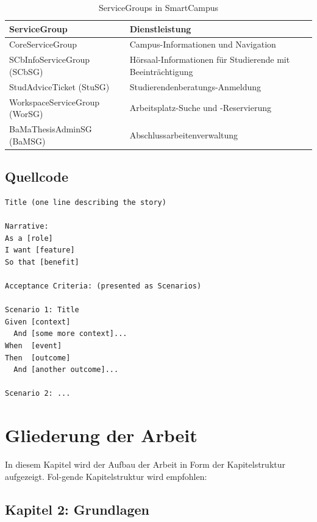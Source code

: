 \begin{table}
	\centering
	\begin{tabular}{ | l | p{7cm} | }
		\hline
		ServiceGroup & Dienstleistung \\
		\hline
		 CoreServiceGroup & Campus-Informationen und Navigation \\
	 	\hline
	 	SCbInfoServiceGroup (SCbSG) & Hörsaal-Informationen für Studierende mit Beeinträchtigung \\
	 	\hline
	 	 StudAdviceTicket (StuSG) & Studierendenberatungs-Anmeldung \\
	 	\hline
	 	WorkspaceServiceGroup (WorSG) & Arbeitsplatz-Suche und -Reservierung \\
	 	\hline
	 	BaMaThesisAdminSG (BaMSG) & Abschlussarbeitenverwaltung \\
	 	\hline
	\end{tabular}
	\caption{ServiceGroups in SmartCampus}
	\label{tab:smartcampus-servicegroups}
\end{table}

\subsection{Quellcode}
\vspace{0.5cm}
\begin{lstlisting}[caption = {Vorlage für eine Story und Szenarien nach BDD}, label = {lst:bdd-stories-szenarien-template}, style = kit-cm, language = Gherkin]
Title (one line describing the story)
 
Narrative:
As a [role]
I want [feature]
So that [benefit]
 
Acceptance Criteria: (presented as Scenarios)
 
Scenario 1: Title
Given [context]
  And [some more context]...
When  [event]
Then  [outcome]
  And [another outcome]...
 
Scenario 2: ...
\end{lstlisting}

\section{Gliederung der Arbeit}
\label{sec:gliederung}
In diesem Kapitel wird der Aufbau der Arbeit in Form der Kapitelstruktur aufgezeigt. Fol-gende Kapitelstruktur wird empfohlen:

\subsection*{Kapitel 2: Grundlagen}

